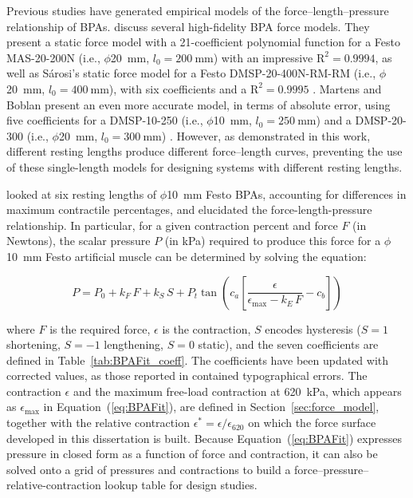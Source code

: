 Previous studies have generated empirical models of the force--length--pressure relationship of BPAs. \citet{sarosi_comparative_2017} discuss several high-fidelity BPA force models. They present a static force model with a 21-coefficient polynomial function for a Festo MAS-20-200N (i.e., $\phi$\qty{20}{\mm}, $l_0=\qty{200}{\mm}$) with an impressive $\text{R}^2=0.9994$, as well as S\'arosi's static force model for a Festo DMSP-20-400N-RM-RM (i.e., $\phi$\qty{20}{\mm}, $l_0=\qty{400}{\mm}$), with six coefficients and a $\text{R}^2=0.9995$ \citep{sarosi_new_2012, sarosi_investigation_2013}. Martens and Boblan present an even more accurate model, in terms of absolute error, using five coefficients for a DMSP-10-250 (i.e., $\phi$\qty{10}{\mm}, $l_0=\qty{250}{\mm}$) and a DMSP-20-300 (i.e., $\phi$\qty{20}{\mm}, $l_0=\qty{300}{\mm}$) \citep{martens_modeling_2017}. However, as demonstrated in this work, different resting lengths produce different force--length curves, preventing the use of these single-length models for designing systems with different resting lengths.

\citet{hunt_modeling_2017} looked at six resting lengths of $\phi$\qty{10}{\mm} Festo BPAs, accounting for differences in maximum contractile percentages, and elucidated the force-length-pressure relationship. In particular, for a given contraction percent and force $F$ (in Newtons), the scalar pressure $P$ (in kPa) required to produce this force for a $\phi$\qty{10}{\mm} Festo artificial muscle can be determined by solving the equation:

\begin{equation}
P = P_{0} + k_{F}\,F + k_{S}\,S + P_{t}\tan\!\left(c_{a}\left[\frac{\epsilon}{\epsilon_{\max} - k_{E}\,F} - c_{b}\right]\right) \label{eq:BPAFit}
\end{equation}

\noindent
where $F$ is the required force, $\epsilon$ is the contraction, $S$ encodes hysteresis ($S=1$ shortening, $S=-1$ lengthening, $S=0$ static), and the seven coefficients are defined in Table~\ref{tab:BPAFit_coeff}. The coefficients have been updated with corrected values, as those reported in \citet{hunt_modeling_2017} contained typographical errors. The contraction $\epsilon$ and the maximum free-load contraction at \qty{620}{\kPa}, which appears as $\epsilon_{\max}$ in Equation~(\ref{eq:BPAFit}), are defined in Section~\ref{sec:force_model}, together with the relative contraction $\epsilon^{*} = \epsilon/\epsilon_{620}$ on which the force surface developed in this dissertation is built. Because Equation~(\ref{eq:BPAFit}) expresses pressure in closed form as a function of force and contraction, it can also be solved onto a grid of pressures and contractions to build a force--pressure--relative-contraction lookup table for design studies.

